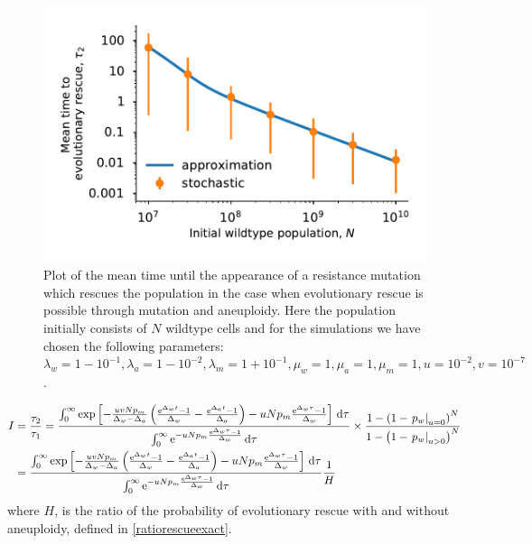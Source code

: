 \documentclass[12pt]{extarticle}
\renewcommand{\d}{{\rm d}}
\newcommand{\e}{{\rm e}}
\begin{document}
\begin{figure}[!t]
 \vspace*{1\baselineskip}
\includegraphics[width=1\textwidth]{Figures/MeanTimeDeleteriousPlot.pdf}
\caption{Plot of the mean time until the appearance of a resistance mutation which rescues the population in the case when evolutionary rescue is possible 
 through mutation and aneuploidy.  Here the population initially consists of $N$ wildtype cells and for the simulations we have chosen the following parameters: $\lambda_w=1-10^{-1},\lambda_a=1-10^{-2},\lambda_m=1+10^{-1},\mu_w=1,\mu_a=1,\mu_m=1,u=10^{-2},v=10^{-7}$.}
\label{MeanTimeDeleteriousAneuploidyPlot}
\end{figure}


\begin{align}\nonumber
I&=\frac{\tau_2}{\tau_1}=\frac{\int_0^\infty\exp\left[-\frac{uvNp_m}{\Delta_w-\Delta_a}\left(\frac{\e^{\Delta_wt}-1}{\Delta_w}-\frac{\e^{\Delta_at}-1}{\Delta_a}\right)-uNp_m\frac{\e^{\Delta_w\tau}-1}{\Delta_w}\right]\,\d\tau}{\int_0^\infty\e^{-uNp_m\frac{\e^{\Delta_w\tau}-1}{\Delta_w}}\,\d\tau}\times\frac{1-\left(1-\left.p_w\right|_{u=0}\right)^N}{1-\left(1-\left.p_w\right|_{u>0}\right)^N}\\
&=\frac{\int_0^\infty\exp\left[-\frac{uvNp_m}{\Delta_w-\Delta_a}\left(\frac{\e^{\Delta_wt}-1}{\Delta_w}-\frac{\e^{\Delta_at}-1}{\Delta_a}\right)-uNp_m\frac{\e^{\Delta_w\tau}-1}{\Delta_w}\right]\,\d\tau}{\int_0^\infty\e^{-uNp_m\frac{\e^{\Delta_w\tau}-1}{\Delta_w}}\,\d\tau}\frac{1}{H}
\end{align}
where $H$, is the ratio of the probability of evolutionary rescue with and without aneuploidy, defined in \eqref{ratiorescueexact}. 
\end{document}
